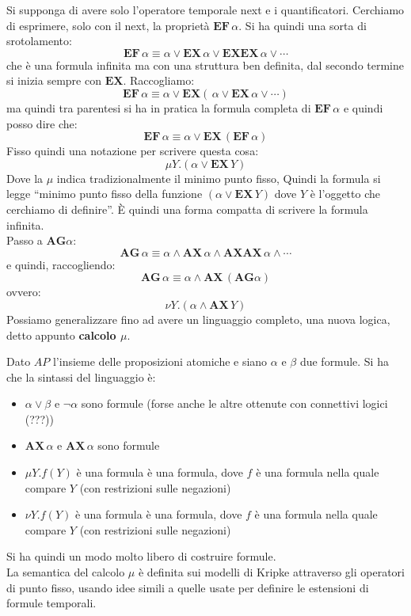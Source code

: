 Si supponga di avere solo l'operatore temporale next e i
quantificatori. Cerchiamo di esprimere, solo con il next, la proprietà
$\mathbf{EF}\,\alpha$. Si ha quindi una sorta di srotolamento:
\[\mathbf{EF}\,\alpha\equiv \alpha\lor
  \mathbf{EX}\,\alpha\lor\mathbf{EXEX}\,\alpha\lor\cdots\]
che è una formula infinita ma con una struttura ben definita, dal secondo
termine si inizia sempre con $\mathbf{EX}$. Raccogliamo:
\[\mathbf{EF}\,\alpha\equiv \alpha\lor
  \mathbf{EX}(\,\alpha\lor\mathbf{EX}\,\alpha\lor\cdots)\]
ma quindi tra parentesi si ha in pratica la formula completa di
$\mathbf{EF}\,\alpha$ e quindi posso dire che:
\[\mathbf{EF}\,\alpha\equiv\alpha\lor\mathbf{EX}\,(\mathbf{EF}\,\alpha)\]
Fisso quindi una notazione per scrivere questa cosa:
\[\mu Y.(\alpha\lor \mathbf{EX}\, Y)\]
Dove la $\mu$ indica tradizionalmente il minimo punto fisso, Quindi la formula
si legge ``minimo punto fisso della funzione $(\alpha\lor \mathbf{EX}\, Y)$ dove
$Y$ è l'oggetto che cerchiamo di definire''. È quindi una forma compatta di
scrivere la formula infinita.\\
Passo a $\mathbf{AG}\alpha$:
\[\mathbf{AG}\,\alpha\equiv \alpha\land
  \mathbf{AX}\,\alpha\land\mathbf{AXAX}\,\alpha\land\cdots\]
e quindi, raccogliendo:
\[\mathbf{AG}\,\alpha\equiv\alpha\land \mathbf{AX}\,(\mathbf{AG}\alpha)\]
ovvero:
\[\nu Y.(\alpha\land\mathbf{AX}\, Y)\]
Possiamo generalizzare fino ad avere un linguaggio completo, una nuova logica,
detto appunto \textbf{calcolo $\mu$}.
\begin{definizione}
  Dato $AP$ l'insieme delle proposizioni atomiche e siano $\alpha$ e $\beta$ due
  formule. Si ha che la sintassi del linguaggio è:
  \begin{itemize}
    \item $\alpha\lor\beta$ e $\neg \alpha$ sono formule (forse anche le altre
    ottenute con connettivi logici (???))
    \item $\mathbf{AX}\,\alpha$ e $\mathbf{AX}\,\alpha$ sono formule
    \item $\mu Y.f(Y)$ è una formula è una formula, dove $f$ è una formula nella
    quale compare $Y$ (con restrizioni sulle negazioni) 
    \item $\nu Y.f(Y)$ è una formula è una formula, dove $f$ è una formula nella
    quale compare $Y$ (con restrizioni sulle negazioni)
  \end{itemize}
  Si ha quindi un modo molto libero di costruire formule.\\
  La semantica del calcolo $\mu$ è definita sui modelli di Kripke attraverso gli
  operatori di punto fisso, usando idee simili a quelle usate per definire le
  estensioni di formule temporali.
\end{definizione}

